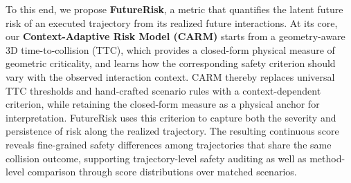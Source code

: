 \documentclass[letterpaper, 10 pt, conference]{ieeeconf}  %
\begin{document}


To this end, we propose \textbf{FutureRisk}, a metric that quantifies the latent future risk of an executed trajectory from its realized future interactions. At its core, our \textbf{Context-Adaptive Risk Model (CARM)} starts from a geometry-aware 3D time-to-collision (TTC), which provides a closed-form physical measure of geometric criticality, and learns how the corresponding safety criterion should vary with the observed interaction context. CARM thereby replaces universal TTC thresholds and hand-crafted scenario rules with a context-dependent criterion, while retaining the closed-form measure as a physical anchor for interpretation. FutureRisk uses this criterion to capture both the severity and persistence of risk along the realized trajectory. The resulting continuous score reveals fine-grained safety differences among trajectories that share the same collision outcome, supporting trajectory-level safety auditing as well as method-level comparison through score distributions over matched scenarios. 
\end{document}

